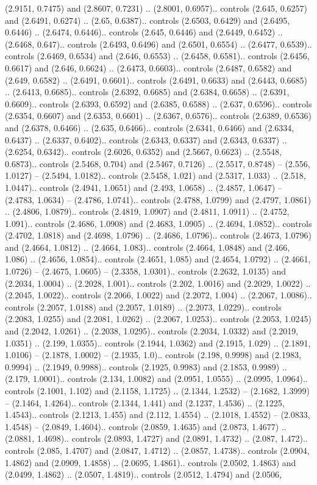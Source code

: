 (2.9151, 0.7475) and (2.8607, 0.7231) .. (2.8001, 0.6957).. controls (2.645, 0.6257) and (2.6491, 0.6274) .. (2.65, 0.6387).. controls (2.6503, 0.6429) and (2.6495, 0.6446) .. (2.6474, 0.6446).. controls (2.645, 0.6446) and (2.6449, 0.6452) .. (2.6468, 0.647).. controls (2.6493, 0.6496) and (2.6501, 0.6554) .. (2.6477, 0.6539).. controls (2.6469, 0.6534) and (2.646, 0.6553) .. (2.6458, 0.6581).. controls (2.6456, 0.6617) and (2.646, 0.6624) .. (2.6473, 0.6603).. controls (2.6487, 0.6582) and (2.649, 0.6582) .. (2.6491, 0.6601).. controls (2.6491, 0.6633) and (2.6443, 0.6685) .. (2.6413, 0.6685).. controls (2.6392, 0.6685) and (2.6384, 0.6658) .. (2.6391, 0.6609).. controls (2.6393, 0.6592) and (2.6385, 0.6588) .. (2.637, 0.6596).. controls (2.6354, 0.6607) and (2.6353, 0.6601) .. (2.6367, 0.6576).. controls (2.6389, 0.6536) and (2.6378, 0.6466) .. (2.635, 0.6466).. controls (2.6341, 0.6466) and (2.6334, 0.6437) .. (2.6337, 0.6402).. controls (2.6343, 0.6337) and (2.6343, 0.6337) .. (2.6254, 0.6342).. controls (2.6026, 0.6352) and (2.5667, 0.6623) .. (2.5548, 0.6873).. controls (2.5468, 0.704) and (2.5467, 0.7126) .. (2.5517, 0.8748) -- (2.556, 1.0127) -- (2.5494, 1.0182).. controls (2.5458, 1.021) and (2.5317, 1.033) .. (2.518, 1.0447).. controls (2.4941, 1.0651) and (2.493, 1.0658) .. (2.4857, 1.0647) -- (2.4783, 1.0634) -- (2.4786, 1.0741).. controls (2.4788, 1.0799) and (2.4797, 1.0861) .. (2.4806, 1.0879).. controls (2.4819, 1.0907) and (2.4811, 1.0911) .. (2.4752, 1.091).. controls (2.4686, 1.0908) and (2.4683, 1.0905) .. (2.4694, 1.0852).. controls (2.4702, 1.0818) and (2.4698, 1.0796) .. (2.4686, 1.0796).. controls (2.4673, 1.0796) and (2.4664, 1.0812) .. (2.4664, 1.083).. controls (2.4664, 1.0848) and (2.466, 1.086) .. (2.4656, 1.0854).. controls (2.4651, 1.085) and (2.4654, 1.0792) .. (2.4661, 1.0726) -- (2.4675, 1.0605) -- (2.3358, 1.0301).. controls (2.2632, 1.0135) and (2.2034, 1.0004) .. (2.2028, 1.001).. controls (2.202, 1.0016) and (2.2029, 1.0022) .. (2.2045, 1.0022).. controls (2.2066, 1.0022) and (2.2072, 1.004) .. (2.2067, 1.0086).. controls (2.2057, 1.0188) and (2.2057, 1.0189) .. (2.2073, 1.0229).. controls (2.2083, 1.0255) and (2.2081, 1.0262) .. (2.2067, 1.0253).. controls (2.2053, 1.0245) and (2.2042, 1.0261) .. (2.2038, 1.0295).. controls (2.2034, 1.0332) and (2.2019, 1.0351) .. (2.199, 1.0355).. controls (2.1944, 1.0362) and (2.1915, 1.029) .. (2.1891, 1.0106) -- (2.1878, 1.0002) -- (2.1935, 1.0).. controls (2.198, 0.9998) and (2.1983, 0.9994) .. (2.1949, 0.9988).. controls (2.1925, 0.9983) and (2.1853, 0.9989) .. (2.179, 1.0001).. controls (2.134, 1.0082) and (2.0951, 1.0555) .. (2.0995, 1.0964).. controls (2.1001, 1.102) and (2.1158, 1.1725) .. (2.1344, 1.2532) -- (2.1682, 1.3999) -- (2.1464, 1.4264).. controls (2.1344, 1.441) and (2.1237, 1.4536) .. (2.1225, 1.4543).. controls (2.1213, 1.455) and (2.112, 1.4554) .. (2.1018, 1.4552) -- (2.0833, 1.4548) -- (2.0849, 1.4604).. controls (2.0859, 1.4635) and (2.0873, 1.4677) .. (2.0881, 1.4698).. controls (2.0893, 1.4727) and (2.0891, 1.4732) .. (2.087, 1.472).. controls (2.085, 1.4707) and (2.0847, 1.4712) .. (2.0857, 1.4738).. controls (2.0904, 1.4862) and (2.0909, 1.4858) .. (2.0695, 1.4861).. controls (2.0502, 1.4863) and (2.0499, 1.4862) .. (2.0507, 1.4819).. controls (2.0512, 1.4794) and (2.0506, 